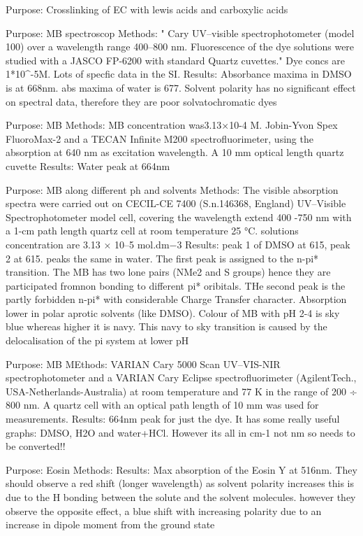 \cite{von2020dual}
Purpose: Crosslinking of EC with lewis acids and carboxylic acids



\cite{gilani2013solvatochromism}
Purpose: MB spectroscop
Methods: " Cary UV–visible spectrophotometer (model 100) over a wavelength range 400–800 nm. Fluorescence of the dye solutions were studied with a JASCO FP-6200 with standard Quartz cuvettes." Dye concs are 1*10^{-5}M. Lots of specfic data in the SI. 
Results: Absorbance maxima in DMSO is at 668nm. abs maxima of water is 677. Solvent polarity has no significant effect on spectral data, therefore  they are poor solvatochromatic dyes

\cite{moreira2017methylene}
Purpose: MB
Methods: MB concentration was3.13×10-4 M. Jobin-Yvon Spex FluoroMax-2 and a TECAN Infinite M200 spectrofluorimeter, using the absorption at 640 nm as excitation wavelength. A 10 mm optical length quartz cuvette 
Results: Water peak at 664nm 

\cite{hemdan2023shift}
Purpose: MB along different ph and solvents
Methods:  The visible absorption spectra were carried out on CECIL-CE
7400 (S.n.146368, England) UV–Visible Spectrophotometer model cell, covering the wavelength extend 400 -750 nm with a 1-cm path length quartz cell at room temperature 25 °C. solutions concentration are 3.13 × 10–5 mol.dm−3
Results: peak 1 of DMSO at 615, peak 2 at 615. peaks the same in water. The first peak is assigned to the n-pi* transition. The MB has two lone pairs (NMe2 and S groups) hence they are participated fromnon bonding to different pi* oribitals. THe second peak is the partly forbidden n-pi* with considerable Charge Transfer character. Absorption lower in polar aprotic solvents (like DMSO). Colour of MB with pH 2-4 is sky blue whereas higher it is navy. This navy to sky transition is caused by the delocalisation of the pi system at lower pH

\cite{tchaikovskaya2023solvent}
Purpose: MB
MEthods: VARIAN Cary 5000 Scan UV–VIS-NIR spectrophotometer and a VARIAN Cary Eclipse spectrofluorimeter (AgilentTech., USA-Netherlands-Australia) at room temperature and 77 K in the range of 200 ÷ 800 nm. A quartz cell with an optical path length of 10 mm was used for measurements.
Results: 664nm peak for just the dye. It has some really useful graphs: DMSO, H2O and water+HCl. However its all in cm-1 not nm so needs to be converted!!


\cite{aroteinvestigating}
Purpose: Eosin
Methods:
Results: Max absorption of the Eosin Y at 516nm. They should observe a red shift (longer wavelength) as solvent polarity increases this is due to the H bonding between the solute and the solvent molecules. however they observe the opposite effect, a blue shift with increasing polarity due to an increase in dipole moment from the ground state

